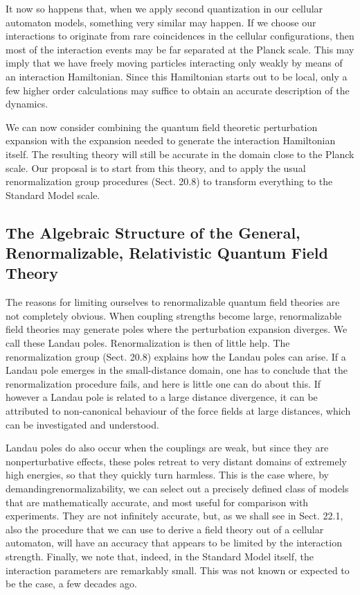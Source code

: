 \documentclass[main.tex]{subfiles}
\begin{document}
It now so happens that, when we apply second quantization in our cellular automaton models, something very similar may happen. If we choose our interactions to originate from rare coincidences in the cellular configurations, then most of the interaction events may be far separated at the Planck scale. This may imply that we have freely moving particles interacting only weakly by means of an interaction Hamiltonian. Since this Hamiltonian starts out to be local, only a few higher order calculations may suffice to obtain an accurate description of the dynamics.

We can now consider combining the quantum field theoretic perturbation expansion with the expansion needed to generate the interaction Hamiltonian itself. The resulting theory will still be accurate in the domain close to the Planck scale. Our proposal is to start from this theory, and to apply the usual renormalization group procedures (Sect. 20.8) to transform everything to the Standard Model scale.

\subsection{The Algebraic Structure of the General, Renormalizable, Relativistic Quantum Field Theory}\label{ch20.5}

The reasons for limiting ourselves to renormalizable quantum field theories are not completely obvious. When coupling strengths become large, renormalizable field theories may generate poles where the perturbation expansion diverges. We call these Landau poles. Renormalization is then of little help. The renormalization group (Sect. 20.8) explains how the Landau poles can arise. If a Landau pole emerges in the small-distance domain, one has to conclude that the renormalization procedure fails, and here is little one can do about this. If however a Landau pole is related to a large distance divergence, it can be attributed to non-canonical behaviour of the force fields at large distances, which can be investigated and understood.

Landau poles do also occur when the couplings are weak, but since they are nonperturbative effects, these poles retreat to very distant domains of extremely high energies, so that they quickly turn harmless. This is the case where, by demandingrenormalizability, we can select out a precisely defined class of models that are mathematically accurate, and most useful for comparison with experiments. They are not infinitely accurate, but, as we shall see in Sect. 22.1, also the procedure that we can use to derive a field theory out of a cellular automaton, will have an accuracy that appears to be limited by the interaction strength.
Finally, we note that, indeed, in the Standard Model itself, the interaction parameters are remarkably small. This was not known or expected to be the case, a few decades ago.
\end{document}
